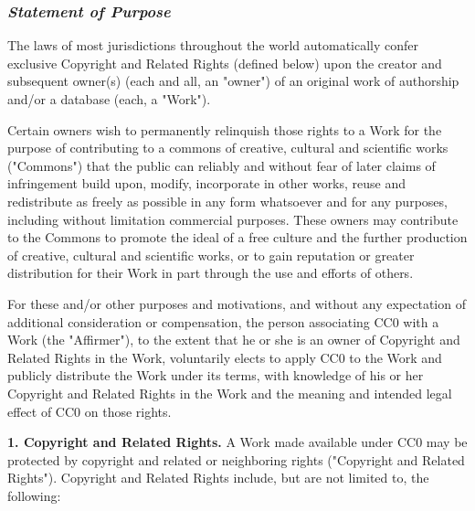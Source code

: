 \subsubsection{\emph{Statement of Purpose}}
\par The laws of most jurisdictions throughout the world
automatically confer exclusive Copyright and Related Rights
(defined below) upon the creator and subsequent owner(s) (each
and all, an "owner") of an original work of authorship and/or
a database (each, a "Work").
\par Certain owners wish to permanently relinquish those rights
to a Work for the purpose of contributing to a commons of
creative, cultural and scientific works ("Commons") that the
public can reliably and without fear of later claims of
infringement build upon, modify, incorporate in other works,
reuse and redistribute as freely as possible in any form
whatsoever and for any purposes, including without limitation
commercial purposes. These owners may contribute to the
Commons to promote the ideal of a free culture and the further
production of creative, cultural and scientific works, or to
gain reputation or greater distribution for their Work in part
through the use and efforts of others.
\par For these and/or other purposes and motivations, and
without any expectation of additional consideration or
compensation, the person associating CC0 with a Work (the
"Affirmer"), to the extent that he or she is an owner of
Copyright and Related Rights in the Work, voluntarily elects
to apply CC0 to the Work and publicly distribute the Work
under its terms, with knowledge of his or her Copyright and
Related Rights in the Work and the meaning and intended legal
effect of CC0 on those rights.
\par \textbf{1. Copyright and Related Rights.}
A Work made available under CC0 may be protected by
copyright and related or neighboring rights ("Copyright and
Related Rights"). Copyright and Related Rights include, but
are not limited to, the following:

